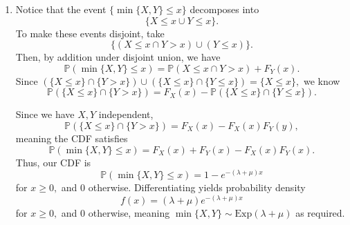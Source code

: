 \documentclass[12pt]{article}
\begin{document}
\begin{enumerate}
    Similarly, for $V = X/Y$ let us construct the change of variables
    $U = X, V = X/ Y,$ with map $T: \mathbb R^2 \setminus \{(x, y) :
    y  = 0\} \to \mathbb R^{2} \setminus \{(x, y) : y = 0\}$ defined by
    $$
    T(x, y) = (x, x/y),
    $$
    meaning the inverse satisfies $T^{-1} : D \to D$
    $$
    T^{-1}(u, v) = (u, u/v),
    $$
    where $D = \mathbb R^{2} \setminus \{(x,y) : y \neq 0\}.$ This has Jacobian
    $$
    J =
    \begin{vmatrix}
      1 & 0 \\
      \dfrac{1}{v} & -\dfrac{u}{v^2}
    \end{vmatrix}  = -u/v^2.
    $$
    Hence, $U, V$ have joint density
    $$
    g(u, v) =  \dfrac{f(u, u/v) |u|}{v^2},
    $$
    allowing us to compute the marginal
    as
    $$
    f_V(v) = \int_{-\infty}^{\infty} \dfrac{f_X(x) f_Y(x/v) |x|}{v^2} \, dx.
    $$
    Letting $x = vy,$ we get $\,dx = v \, dy,$
    meaning
    \begin{align*}
      f_V(v) &= \dfrac{v}{|v|}\int_{-\infty}^{\infty} f_X(vy) f_Y(y)
      |vy| \dfrac{ v }{v^2}\, dy \\
      &=  \int_{-\infty}^{\infty} f_X(vy) f_Y(y) |y| \, dy
    \end{align*}
    as required.

  \item Notice that the event $\{\min\{X, Y\} \leq x\}$ decomposes into
    $$
    \{X \leq x \cup Y \leq x\}.
    $$
    To make these events disjoint, take
    $$
    \{(X \leq x \cap Y > x) \cup (Y \leq x)\}.
    $$
    Then, by addition under disjoint union, we have
    $$
    \mathbb P(\min\{X, Y\} \leq x) = \mathbb P(X \leq x \cap Y > x) + F_Y(x).
    $$
    Since $(\{X \leq x\}\cap \{Y > x\}) \cup (\{X \leq x\} \cap \{Y
    \leq x\}) = \{X \leq x\},$ we know
    $$
    \mathbb P(\{X \leq x\} \cap \{Y > x\}) = F_X(x) - \mathbb P(\{X
    \leq x\} \cap \{Y \leq x\}).
    $$

    Since we have $X, Y$ independent,
    $$
    \mathbb P(\{X \leq x\} \cap \{Y > x\}) = F_X(x) -F_X(x) F_Y(y),
    $$
    meaning the CDF satisfies
    $$
    \mathbb P(\min\{X, Y\} \leq x) = F_X(x) + F_Y(x)- F_X(x)F_Y(x).
    $$
    Thus, our CDF is $$
    \mathbb P(\min\{X, Y\} \leq x) = 1  - e^{-(\lambda + \mu)x}
    $$
    for $x \geq 0,$ and $0$ otherwise.
    Differentiating yields probability density
    $$
    f(x) = (\lambda + \mu) e^{-(\lambda + \mu)x}
    $$
    for $x \geq 0,$ and $0$ otherwise, meaning $\min\{X, Y\} \sim
    \text{Exp}(\lambda + \mu)$ as required.
\end{enumerate}
\end{document}
